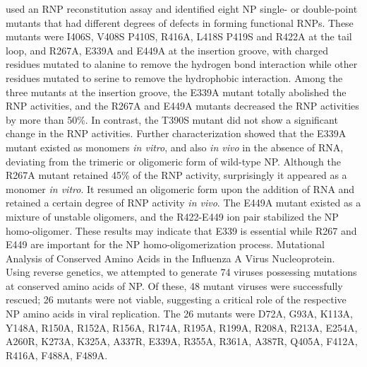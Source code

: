 \citep{1232} used an RNP reconstitution assay and identified eight NP single- or double-point mutants that had different degrees of defects in forming functional RNPs. These mutants were I406S, V408S P410S, R416A, L418S P419S and R422A at the tail loop, and R267A, E339A and E449A at the insertion groove, with charged residues mutated to alanine to remove the hydrogen bond interaction while other residues mutated to serine to remove the hydrophobic interaction. Among the three mutants at the insertion groove, the E339A mutant totally abolished the RNP activities, and the R267A and E449A mutants decreased the RNP activities by more than 50\%. In contrast, the T390S mutant did not show a significant change in the RNP activities. Further characterization showed that the E339A mutant existed as monomers \textit{in vitro}, and also \textit{in vivo} in the absence of RNA, deviating from the trimeric or oligomeric form of wild-type NP. Although the R267A mutant retained 45\% of the RNP activity, surprisingly it appeared as a monomer \textit{in vitro}. It resumed an oligomeric form upon the addition of RNA and retained a certain degree of RNP activity \textit{in vivo}. The E449A mutant existed as a mixture of unstable oligomers, and the R422-E449 ion pair stabilized the NP homo-oligomer. These results may indicate that E339 is essential while R267 and E449 are important for the NP homo-oligomerization process.
\citep{1561} Mutational Analysis of Conserved Amino Acids in the Influenza A Virus Nucleoprotein. Using reverse genetics, we attempted to generate 74 viruses possessing mutations at conserved amino acids of NP. Of these, 48 mutant viruses were successfully rescued; 26 mutants were not viable, suggesting a critical role of the respective NP amino acids in viral replication. The 26 mutants were D72A, G93A, K113A, Y148A, R150A, R152A, R156A, R174A, R195A, R199A, R208A, R213A, E254A, A260R, K273A, K325A, A337R, E339A, R355A, R361A, A387R, Q405A, F412A, R416A, F488A, F489A.

